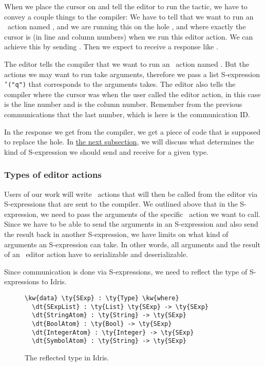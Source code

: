 When we place the cursor on  and tell the editor to run the 
tactic, we have to convey a couple things to the compiler: We have to tell that
we want to run an \Elab\ action named , and we are running this on
the hole , and where exactly the cursor is (in line and column numbers)
when we run this editor action.
We can achieve this by sending .
Then we expect to receive a response like .

The editor tells the compiler that we want to run an \Elab\ action named
. But the actions we may want to run take arguments, therefore we
pass a list S-expression \texttt{'("q")} that corresponds to the arguments
 takes. The editor also tells the compiler where the cursor was when
the user called the editor action, in this case  is the line number and
 is the column number. Remember from the previous communications that the
last number, which is  here is the communication ID.

In the response we get from the compiler, we get a piece of code that is
supposed to replace the hole. In \hyperref[sec:types]{the next subsection}, we
will discuss what determines the kind of S-expression we should send and
receive for a given type.

\subsubsection{Types of editor actions}\label{sec:types}

Users of our work will write \Elab\ actions that will then be called from the
editor via S-expressions that are sent to the compiler. We outlined above that
in the S-expression, we need to pass the arguments of the specific
\Elab\ action we want to call. Since we have to be able to send the arguments
in an S-expression and also send the result back in another S-expression, we
have limits on what kind of arguments an S-expression can take.
In other words, all arguments and the result of an \Elab\ editor action
have to serializable and deserializable.

Since communication is done via S-expressions, we need to reflect the type of
\mbox{S-expressions} to Idris.

\begin{figure}[H]
  \caption{The reflected type  in Idris.}
  \label{code:definitionSExp}
\begin{Verbatim}
\kw{data} \ty{SExp} : \ty{Type} \kw{where}
  \dt{SExpList} : \ty{List} \ty{SExp} -> \ty{SExp}
  \dt{StringAtom} : \ty{String} -> \ty{SExp}
  \dt{BoolAtom} : \ty{Bool} -> \ty{SExp}
  \dt{IntegerAtom} : \ty{Integer} -> \ty{SExp}
  \dt{SymbolAtom} : \ty{String} -> \ty{SExp}
\end{Verbatim}
\end{figure}

